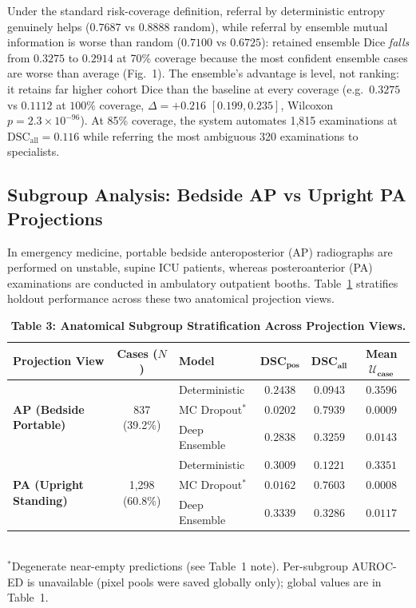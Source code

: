 \documentclass[11pt,a4paper]{article}
\begin{document}
Under the standard risk-coverage definition, referral by deterministic entropy genuinely helps ($0.7687$ vs $0.8888$ random), while referral by ensemble mutual information is worse than random ($0.7100$ vs $0.6725$): retained ensemble Dice \emph{falls} from $0.3275$ to $0.2914$ at 70\% coverage because the most confident ensemble cases are worse than average (Fig.~1). The ensemble's advantage is level, not ranking: it retains far higher cohort Dice than the baseline at every coverage (e.g.\ $0.3275$ vs $0.1112$ at $100\%$ coverage, $\Delta = +0.216$ $[0.199, 0.235]$, Wilcoxon $p = 2.3 \times 10^{-96}$). At 85\% coverage, the system automates 1,815 examinations at $\text{DSC}_{\text{all}} = 0.116$ while referring the most ambiguous 320 examinations to specialists.

\subsection{Subgroup Analysis: Bedside AP vs Upright PA Projections}
In emergency medicine, portable bedside anteroposterior (AP) radiographs are performed on unstable, supine ICU patients, whereas posteroanterior (PA) examinations are conducted in ambulatory outpatient booths. Table~\ref{tab:subgroups} stratifies holdout performance across these two anatomical projection views.

\begin{table}[t]
\centering
\small
\caption{\textbf{Table 3: Anatomical Subgroup Stratification Across Projection Views.}}
\label{tab:subgroups}
\begin{tabularx}{\linewidth}{l c l c c c}
\toprule
\textbf{Projection View} & \textbf{Cases ($N$)} & \textbf{Model} & $\mathbf{DSC}_{\mathbf{pos}}$ & $\mathbf{DSC}_{\mathbf{all}}$ & \textbf{Mean $\mathcal{U}_{\mathbf{case}}$} \\
\midrule
\multirow{3}{*}{\textbf{AP (Bedside Portable)}} & \multirow{3}{*}{837 (39.2\%)} 
  & Deterministic & $0.2438$ & $0.0943$ & $0.3596$ \\
& & MC Dropout$^*$  & $0.0202$ & $0.7939$ & $0.0009$ \\
& & Deep Ensemble & $0.2838$ & $\mathbf{0.3259}$ & $0.0143$ \\
\midrule
\multirow{3}{*}{\textbf{PA (Upright Standing)}} & \multirow{3}{*}{1,298 (60.8\%)} 
  & Deterministic & $0.3009$ & $0.1221$ & $0.3351$ \\
& & MC Dropout$^*$    & $0.0162$ & $0.7603$ & $0.0008$ \\
& & Deep Ensemble & $0.3339$ & $\mathbf{0.3286}$ & $0.0117$ \\
\bottomrule
\end{tabularx}
\\[2pt]
{\footnotesize $^*$Degenerate near-empty predictions (see Table~1 note). Per-subgroup AUROC-ED is unavailable (pixel pools were saved globally only); global values are in Table~1.}
\end{table}
\end{document}
